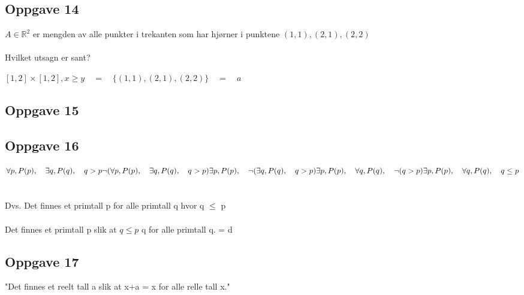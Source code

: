 \documentclass{article}
\newcommand{\eqq}{\quad=\quad}
\begin{document}
\subsection*{Oppgave 14}
\(A \in \mathbb{R}^2\) er mengden av alle punkter i trekanten som har hjørner i punktene $(1, 1), (2, 1), (2, 2)$
\\\\
Hvilket utsagn er sant?

\([1,2]\times[1,2], x\geq y \eqq \{(1, 1), (2, 1), (2,2)\} \eqq a\)


\subsection*{Oppgave 15}

\subsection*{Oppgave 16}

\(
\forall p, P(p), \quad \exists q, P(q), \quad q > p 
\\\\\\
\neg(\forall p, P(p), \quad \exists q, P(q), \quad q > p)
\\\\
\exists p, P(p), \quad \neg(\exists q, P(q), \quad q > p)
\\\\
\exists p, P(p), \quad \forall q, P(q), \quad \neg(q > p)
\\\\
\exists p, P(p), \quad \forall q, P(q), \quad q \leq p
\)
\\\\\\
Dvs. \quad Det finnes et primtall p for alle primtall q hvor q $\leq$ p
\\\\
Det finnes et primtall p slik at $q \leq p$ q for alle primtall q. = d

\subsection*{Oppgave 17}

"Det finnes et reelt tall a slik at x+a = x for alle relle tall x."
\\\\
\(\)
\end{document}
